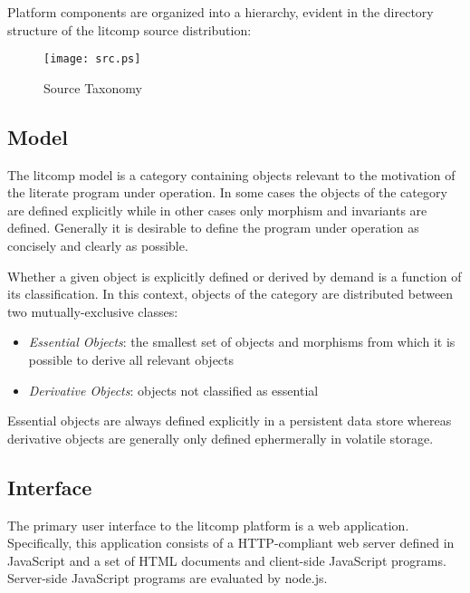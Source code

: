 \documentclass{article}
\begin{document}
Platform components are organized into a hierarchy, evident in the
directory structure of the litcomp source distribution:

\begin{figure}[h!]
  \caption{Source Taxonomy}
  \centering
    \texttt{[image: src.ps]}
\end{figure}

\pagebreak

\subsection {Model}

The litcomp model is a category containing objects relevant to
the motivation of the literate program under operation. In some cases
the objects of the category are defined explicitly while in other cases
only morphism and invariants are defined. Generally it is desirable to
define the program under operation as concisely and clearly as possible.

Whether a given object is explicitly defined or derived by demand is a
function of its classification. In this context, objects of the category
are distributed between two mutually-exclusive classes:

\begin{itemize}

\item {\em Essential Objects}: the smallest set of objects and morphisms
from which it is possible to derive all relevant objects

\item {\em Derivative Objects}: objects not classified as essential

\end{itemize}

Essential objects are always defined explicitly in a persistent data
store whereas derivative objects are generally only defined ephermerally
in volatile storage.

\pagebreak

\subsection {Interface}

The primary user interface to the litcomp platform is a web
application. Specifically, this application consists of a HTTP-compliant
web server defined in JavaScript and a set of HTML documents and
client-side JavaScript programs. Server-side JavaScript programs are
evaluated by node.js.
\end{document}
